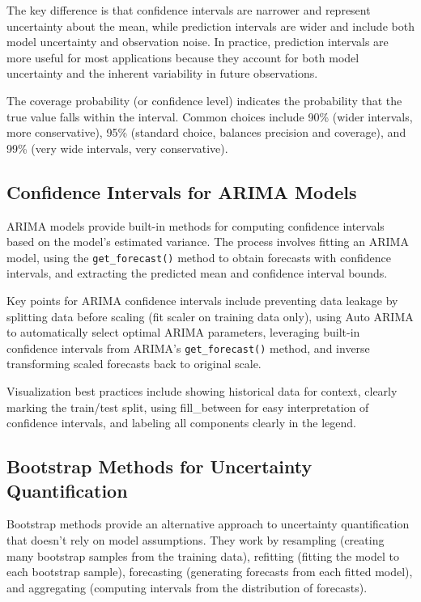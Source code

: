 The key difference is that confidence intervals are narrower and represent uncertainty about the mean, while prediction intervals are wider and include both model uncertainty and observation noise. In practice, prediction intervals are more useful for most applications because they account for both model uncertainty and the inherent variability in future observations.

The coverage probability (or confidence level) indicates the probability that the true value falls within the interval. Common choices include 90\% (wider intervals, more conservative), 95\% (standard choice, balances precision and coverage), and 99\% (very wide intervals, very conservative).

\subsection{Confidence Intervals for ARIMA Models}

ARIMA models provide built-in methods for computing confidence intervals based on the model's estimated variance. The process involves fitting an ARIMA model, using the \texttt{get\_forecast()} method to obtain forecasts with confidence intervals, and extracting the predicted mean and confidence interval bounds.

Key points for ARIMA confidence intervals include preventing data leakage by splitting data before scaling (fit scaler on training data only), using Auto ARIMA to automatically select optimal ARIMA parameters, leveraging built-in confidence intervals from ARIMA's \texttt{get\_forecast()} method, and inverse transforming scaled forecasts back to original scale.

Visualization best practices include showing historical data for context, clearly marking the train/test split, using fill\_between for easy interpretation of confidence intervals, and labeling all components clearly in the legend.

\subsection{Bootstrap Methods for Uncertainty Quantification}

Bootstrap methods provide an alternative approach to uncertainty quantification that doesn't rely on model assumptions. They work by resampling (creating many bootstrap samples from the training data), refitting (fitting the model to each bootstrap sample), forecasting (generating forecasts from each fitted model), and aggregating (computing intervals from the distribution of forecasts).

